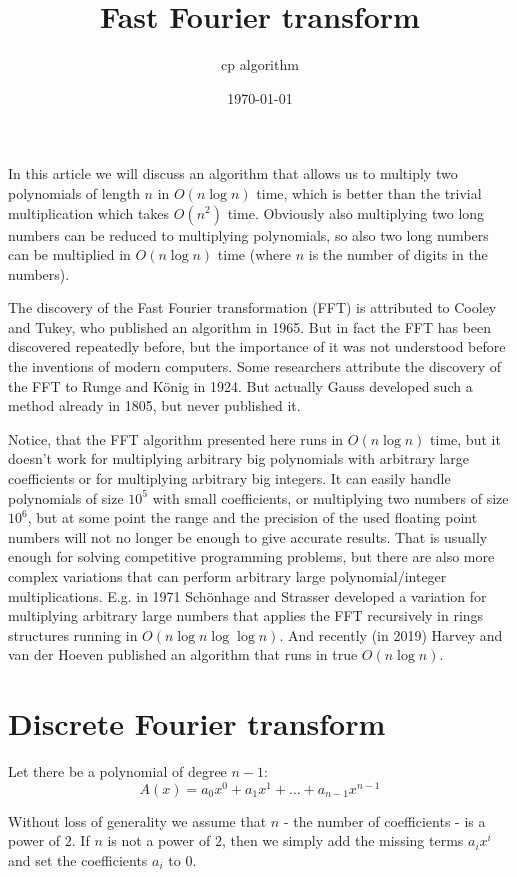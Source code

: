 \documentclass{article}
\title{Fast Fourier transform}
\author{cp algorithm}
\date{\today}
\begin{document}
\maketitle

\tableofcontents

\newpage
In this article we will discuss an algorithm that allows us to multiply two polynomials of length $n$ in $O(n \log n)$ time, which is better than the trivial multiplication which takes $O(n^2)$ time. Obviously also multiplying two long numbers can be reduced to multiplying polynomials, so also two long numbers can be multiplied in $O(n \log n)$ time (where $n$ is the number of digits in the numbers).

The discovery of the Fast Fourier transformation (FFT) is attributed to Cooley and Tukey, who published an algorithm in 1965. But in fact the FFT has been discovered repeatedly before, but the importance of it was not understood before the inventions of modern computers. Some researchers attribute the discovery of the FFT to Runge and König in 1924. But actually Gauss developed such a method already in 1805, but never published it.

Notice, that the FFT algorithm presented here runs in $O(n \log n)$ time, but it doesn't work for multiplying arbitrary big polynomials with arbitrary large coefficients or for multiplying arbitrary big integers. It can easily handle polynomials of size $10^5$ with small coefficients, or multiplying two numbers of size $10^6$, but at some point the range and the precision of the used floating point numbers will not no longer be enough to give accurate results. That is usually enough for solving competitive programming problems, but there are also more complex variations that can perform arbitrary large polynomial/integer multiplications. E.g. in 1971 Schönhage and Strasser developed a variation for multiplying arbitrary large numbers that applies the FFT recursively in rings structures running in $O(n \log n \log \log n)$. And recently (in 2019) Harvey and van der Hoeven published an algorithm that runs in true $O(n \log n)$.

\section{Discrete Fourier transform}

Let there be a polynomial of degree $n - 1$:
$$A(x) = a_0 x^0 + a_1 x^1 + \dots + a_{n-1} x^{n-1}$$

Without loss of generality we assume that $n$ - the number of coefficients - is a power of $2$. If $n$ is not a power of $2$, then we simply add the missing terms $a_i x^i$ and set the coefficients $a_i$ to $0$.
\end{document}
